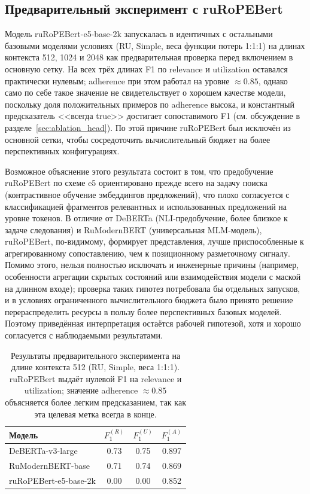 \subsection{Предварительный эксперимент с ruRoPEBert}
\label{sec:rope_preliminary}

Модель ruRoPEBert-e5-base-2k запускалась в идентичных с остальными базовыми моделями
 условиях (RU, Simple, веса функции потерь 1:1:1) на длинах контекста 512, 1024 и 2048 как
  предварительная проверка перед включением в основную сетку. На всех трёх длинах F1 по
   relevance и utilization оставался практически нулевым; adherence при этом работал на
    уровне $\approx 0.85$, однако само по себе такое значение не свидетельствует о
     хорошем качестве модели, поскольку доля положительных примеров по adherence высока, и
      константный предсказатель <<всегда true>> достигает сопоставимого F1
      (см. обсуждение в разделе~\ref{sec:ablation_head}). По этой причине ruRoPEBert был
      исключён из основной сетки, чтобы сосредоточить вычислительный бюджет на более
      перспективных конфигурациях.

Возможное объяснение этого результата состоит в том, что предобучение ruRoPEBert по
 схеме e5 ориентировано прежде всего на задачу поиска (контрастивное обучение
 эмбеддингов предложений), что плохо согласуется с классификацией фрагментов
 релевантных и использованных предложений на уровне токенов. В отличие от DeBERTa
 (NLI-предобучение, более близкое к задаче следования) и RuModernBERT
 (универсальная MLM-модель), ruRoPEBert, по-видимому, формирует представления,
 лучше приспособленные к агрегированному сопоставлению, чем к позиционному
 разметочному сигналу. Помимо этого, нельзя полностью исключать и инженерные
 причины (например, особенности агрегации скрытых состояний или взаимодействия
 модели с маской на длинном входе); проверка таких гипотез потребовала бы
 отдельных запусков, и в условиях ограниченного вычислительного бюджета было
 принято решение перераспределить ресурсы в пользу более перспективных
 базовых моделей. Поэтому приведённая интерпретация остаётся рабочей гипотезой,
 хотя и хорошо согласуется с наблюдаемыми результатами.

\begin{table}[H]
\centering
\small
\caption{Результаты предварительного эксперимента на длине контекста 512 (RU, Simple,
 веса 1:1:1). ruRoPEBert выдаёт нулевой F1 на relevance и utilization; значение
  adherence $\approx 0.85$ объясняется более легким предсказанием, так как эта целевая метка всегда в конце.}
\label{tab:rope_preliminary_512}
\begin{tabular}{lccc}
\toprule
Модель & $F_1^{(R)}$ & $F_1^{(U)}$ & $F_1^{(A)}$ \\
\midrule
DeBERTa-v3-large        & 0.73 & 0.75 & 0.897 \\
RuModernBERT-base       & 0.71 & 0.74 & 0.869 \\
ruRoPEBert-e5-base-2k   & 0.00 & 0.00 & 0.852 \\
\bottomrule
\end{tabular}
\end{table}

